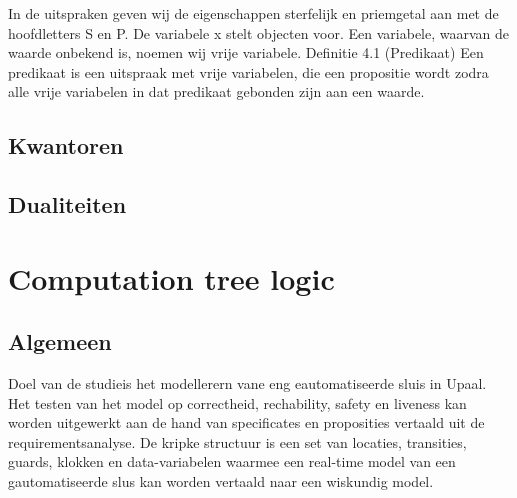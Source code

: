 \documentclass{article}
\begin{document}
	
	
	In de uitspraken geven wij de eigenschappen sterfelijk en priemgetal aan met de hoofdletters
	S en P. De variabele x stelt objecten voor. Een variabele, waarvan de waarde onbekend
	is, noemen wij vrije variabele.
	Definitie 4.1 (Predikaat) Een predikaat is een uitspraak met vrije variabelen, die een
	propositie wordt zodra alle vrije variabelen in dat predikaat gebonden zijn aan een waarde.
	
	\subsection{Kwantoren}
	
	\subsection{Dualiteiten}
	
	\section{Computation tree logic}
	
	\subsection{Algemeen}
	Doel van de studieis het modellerern vane eng eautomatiseerde sluis in Upaal. Het testen van het model op correctheid, rechability, safety en liveness kan worden uitgewerkt aan de hand van specificates en proposities vertaald uit de requirementsanalyse. De kripke structuur is een set van locaties, transities, guards, klokken en data-variabelen waarmee een real-time model van een gautomatiseerde slus kan worden vertaald naar een wiskundig model.
	
\end{document}
